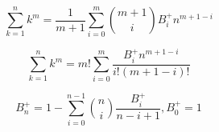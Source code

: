 $$\sum_{k = 1}^{n} k^m = \frac{1}{m + 1} \sum_{i = 0}^{m} \binom{m + 1}{i} B_i^+ n^{m + 1 - i}$$

$$\sum_{k = 1}^{n} k^m = m! \sum_{i = 0}^{m} \frac{B_i^+ n^{m + 1 - i}}{i! (m + 1 - i)!}$$

$$B_n^+ = 1 - \sum_{i = 0}^{n - 1} \binom{n}{i} \frac{B_i^+}{n - i + 1}, B_0^+ = 1$$
